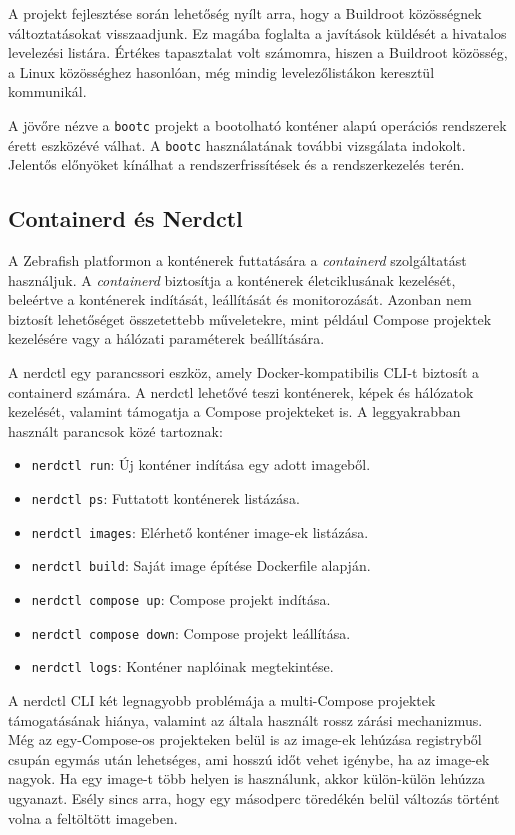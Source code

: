 A projekt fejlesztése során lehetőség nyílt arra, hogy a Buildroot közösségnek változtatásokat visszaadjunk. Ez magába foglalta a javítások küldését a hivatalos levelezési listára. Értékes tapasztalat volt számomra, hiszen a Buildroot közösség, a Linux közösséghez hasonlóan, még mindig levelezőlistákon keresztül kommunikál.

A jövőre nézve a \texttt{bootc} projekt a bootolható konténer alapú operációs rendszerek érett eszközévé válhat. A \texttt{bootc} használatának további vizsgálata indokolt. Jelentős előnyöket kínálhat a rendszerfrissítések és a rendszerkezelés terén.

\subsection{Containerd és Nerdctl}

A Zebrafish platformon a konténerek futtatására a \textit{containerd} szolgáltatást használjuk. A \textit{containerd} biztosítja a konténerek életciklusának kezelését, beleértve a konténerek indítását, leállítását és monitorozását. Azonban nem biztosít lehetőséget összetettebb műveletekre, mint például Compose projektek kezelésére vagy a hálózati paraméterek beállítására.

A nerdctl egy parancssori eszköz, amely Docker-kompatibilis CLI-t biztosít a containerd számára. A nerdctl lehetővé teszi konténerek, képek és hálózatok kezelését, valamint támogatja a Compose projekteket is. A leggyakrabban használt parancsok közé tartoznak:

\begin{itemize}
        \item \texttt{nerdctl run}: Új konténer indítása egy adott imageből.
        \item \texttt{nerdctl ps}: Futtatott konténerek listázása.
        \item \texttt{nerdctl images}: Elérhető konténer image-ek listázása.
        \item \texttt{nerdctl build}: Saját image építése Dockerfile alapján.
        \item \texttt{nerdctl compose up}: Compose projekt indítása.
        \item \texttt{nerdctl compose down}: Compose projekt leállítása.
        \item \texttt{nerdctl logs}: Konténer naplóinak megtekintése.
\end{itemize}

A nerdctl CLI két legnagyobb problémája a multi-Compose projektek támogatásának hiánya, valamint az általa használt rossz zárási mechanizmus.  Még az egy-Compose-os projekteken belül is az image-ek lehúzása registryből csupán egymás után lehetséges, ami hosszú időt vehet igénybe, ha az image-ek nagyok. Ha egy image-t több helyen is használunk, akkor külön-külön lehúzza  ugyanazt. Esély sincs arra, hogy egy másodperc töredékén belül változás történt volna a feltöltött imageben.

